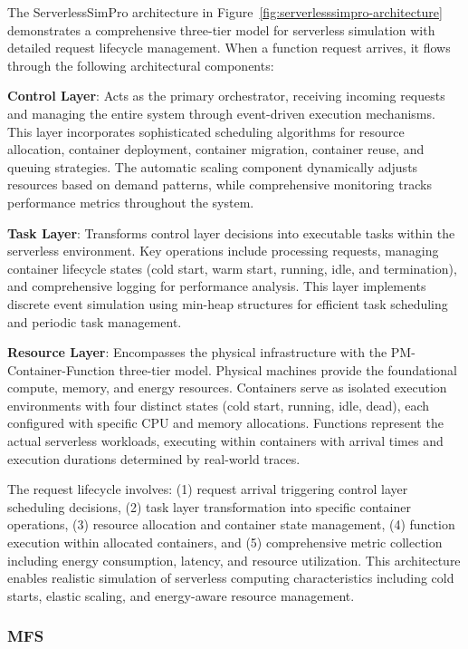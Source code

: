 The ServerlessSimPro architecture in Figure~\ref{fig:serverlesssimpro-architecture} demonstrates a comprehensive three-tier model for serverless simulation with detailed request lifecycle management. When a function request arrives, it flows through the following architectural components:

\textbf{Control Layer}: Acts as the primary orchestrator, receiving incoming requests and managing the entire system through event-driven execution mechanisms. This layer incorporates sophisticated scheduling algorithms for resource allocation, container deployment, container migration, container reuse, and queuing strategies. The automatic scaling component dynamically adjusts resources based on demand patterns, while comprehensive monitoring tracks performance metrics throughout the system.

\textbf{Task Layer}: Transforms control layer decisions into executable tasks within the serverless environment. Key operations include processing requests, managing container lifecycle states (cold start, warm start, running, idle, and termination), and comprehensive logging for performance analysis. This layer implements discrete event simulation using min-heap structures for efficient task scheduling and periodic task management.

\textbf{Resource Layer}: Encompasses the physical infrastructure with the PM-Container-Function three-tier model. Physical machines provide the foundational compute, memory, and energy resources. Containers serve as isolated execution environments with four distinct states (cold start, running, idle, dead), each configured with specific CPU and memory allocations. Functions represent the actual serverless workloads, executing within containers with arrival times and execution durations determined by real-world traces.

The request lifecycle involves: (1) request arrival triggering control layer scheduling decisions, (2) task layer transformation into specific container operations, (3) resource allocation and container state management, (4) function execution within allocated containers, and (5) comprehensive metric collection including energy consumption, latency, and resource utilization. This architecture enables realistic simulation of serverless computing characteristics including cold starts, elastic scaling, and energy-aware resource management.



\subsubsection{MFS}

